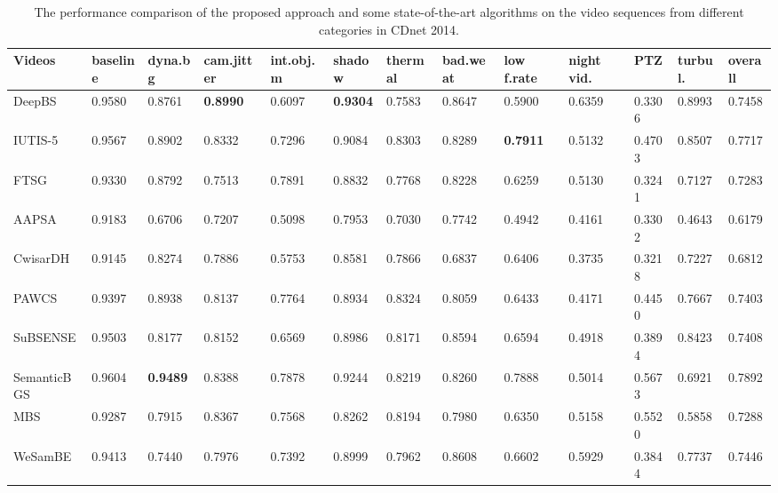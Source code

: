 \documentclass[journal]{IEEEtran}
\begin{document}
\begin{table}[!t]				%
\centering
\caption{The performance comparison of the proposed approach and some state-of-the-art algorithms on the video sequences from different categories in CDnet 2014.}
\label{tab1}
\begin{tabular}{lllllllllllll}
\hline
Videos      & baseline & dyna.bg & cam.jitter & int.obj.m & shadow & thermal & bad.weat & low f.rate & night vid. & PTZ    & turbul. & overall \\ \hline
DeepBS\cite{Babaee2017deep}      & 0.9580   & 0.8761  & \textbf{0.8990}     & 0.6097    & \textbf{0.9304} & 0.7583  & 0.8647   & 0.5900     & 0.6359     & 0.3306 & 0.8993  & 0.7458  \\
IUTIS-5\cite{Bianco2017TEC}     & 0.9567   & 0.8902  & 0.8332     & 0.7296    & 0.9084 & 0.8303  & 0.8289   & \textbf{0.7911}     & 0.5132     & 0.4703 & 0.8507  & 0.7717  \\
FTSG\cite{Wang2014FTSG}        & 0.9330   & 0.8792  & 0.7513     & 0.7891    & 0.8832 & 0.7768  & 0.8228   & 0.6259     & 0.5130     & 0.3241 & 0.7127  & 0.7283  \\
AAPSA\cite{RAMIREZALONSO2016990}       & 0.9183   & 0.6706  & 0.7207     & 0.5098    & 0.7953 & 0.7030  & 0.7742   & 0.4942     & 0.4161     & 0.3302 & 0.4643  & 0.6179  \\
CwisarDH\cite{Gregorio2014CwisarDH}    & 0.9145   & 0.8274  & 0.7886     & 0.5753    & 0.8581 & 0.7866  & 0.6837   & 0.6406     & 0.3735     & 0.3218 & 0.7227  & 0.6812  \\
PAWCS\cite{Charles2015PAWCS}       & 0.9397   & 0.8938  & 0.8137     & 0.7764    & 0.8934 & 0.8324  & 0.8059   & 0.6433     & 0.4171     & 0.4450 & 0.7667  & 0.7403  \\
SuBSENSE\cite{St-Charles2015SuBSENSE}    & 0.9503   & 0.8177  & 0.8152     & 0.6569    & 0.8986 & 0.8171  & 0.8594   & 0.6594     & 0.4918     & 0.3894 & 0.8423  & 0.7408  \\
SemanticBGS\cite{Braham2017Semantic} & 0.9604   & \textbf{0.9489}  & 0.8388     & 0.7878    & 0.9244 & 0.8219  & 0.8260   & 0.7888     & 0.5014     & 0.5673 & 0.6921  & 0.7892  \\
MBS\cite{Multimode_Background_Subtraction}         & 0.9287   & 0.7915  & 0.8367     & 0.7568    & 0.8262 & 0.8194  & 0.7980   & 0.6350     & 0.5158     & 0.5520 & 0.5858  & 0.7288  \\
WeSamBE\cite{2017_TCSVT_BG_7938679}     & 0.9413   & 0.7440  & 0.7976     & 0.7392    & 0.8999 & 0.7962  & 0.8608   & 0.6602     & 0.5929     & 0.3844 & 0.7737  & 0.7446  \\

\end{tabular}
\end{table}
\end{document}
